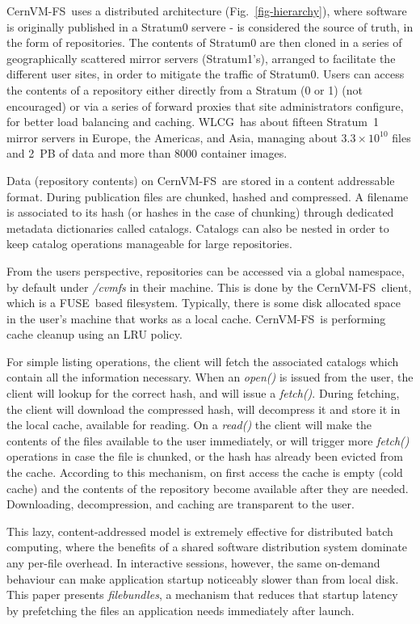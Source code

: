 \documentclass{webofc}
\newcommand{\cvmfs}{CernVM-FS}
\newcommand{\fuse}{FUSE}
\newcommand{\wlcg}{WLCG}
\newcommand{\filebundles}{\emph{filebundles}}
\begin{document}
\cvmfs\ uses a distributed architecture (Fig.~\ref{fig-hierarchy}), where software is originally published in a Stratum0 servere - is considered the source of truth, in the form of repositories.
The contents of Stratum0 are then cloned in a series of geographically scattered mirror servers (Stratum1's), arranged to facilitate the different user sites, in order to mitigate the traffic of Stratum0.
Users can access the contents of a repository either directly from a Stratum (0 or 1) (not encouraged) or via a series of forward proxies that site administrators configure, for better load balancing and caching.
\wlcg\ has about fifteen Stratum~1 mirror servers in Europe, the Americas, and Asia, managing about $3.3\times10^{10}$ files
and 2~PB of data and more than 8000 container images.

Data (repository contents) on \cvmfs\ are stored in a content addressable format.
During publication files are chunked, hashed and compressed.
A filename is associated to its hash (or hashes in the case of chunking) through dedicated metadata dictionaries called catalogs.
Catalogs can also be nested in order to keep catalog operations manageable for large repositories.

From the users perspective, repositories can be accessed via a global namespace, by default under  \emph{/cvmfs} in their machine.
This is done by the \cvmfs\ client, which is a \fuse\ based filesystem.
Typically, there is some disk allocated space in the user's machine that works as a local cache.
\cvmfs\ is performing cache cleanup using an LRU policy.

For simple listing operations, the client will fetch the associated catalogs which contain all the information necessary.
When an \emph{open()}  is issued from the user, the client will lookup for the correct hash, and will issue a \emph{fetch()}.
During fetching, the client will download the compressed hash, will decompress it and store it in the local cache, available for reading.
On a \emph{read()} the client will make the contents of the files available to the user immediately, or will trigger more \emph{fetch()} operations in case the file is chunked, or the hash has already been evicted from the cache.
According to this mechanism, on first access the cache is empty (cold cache) and the contents of the repository become available after they are needed.
Downloading, decompression, and caching are transparent to the user.


This lazy, content-addressed model is extremely effective for
distributed batch computing, where the benefits of a shared software
distribution system dominate any per-file overhead. In interactive
sessions, however, the same on-demand behaviour can make application
startup noticeably slower than from local disk. This paper presents
\emph{\filebundles}, a mechanism that reduces that startup latency by
prefetching the files an application needs immediately after launch.
\end{document}
